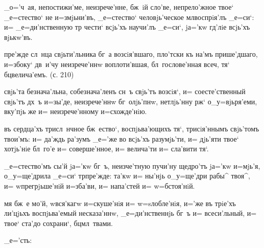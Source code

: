    _о='ч~ая, непостижи'ме, 
неизрече'нне, бж~iй сло'ве, непрело'жное твое` 
_е=стество` не и=змjьни'въ, _е=стество` человjь'ческое 
мл воспрiя'лъ _е=си`: и= _е=ди'нственную тр 
чести` всjь'хъ научи'лъ _е=си`, jа='кw гд'лiе 
всjь'хъ вjькw'въ.


  пре'жде сл~нца свjьти'льника бг~а 
возсiя'вшаго, пло'тски къ на'мъ прише'дшаго, и=з\ъ боку` 
дв~и'чу неизрече'ннw воплоти'вшая, бл~гослове'нная 
всеч, тя` бц велича'емъ. (с. 210)

 свjь'та безнача'льна, собезнача'ленъ сн~ъ 
свjь'тъ возсiя`, и= соесте'ственный свjь'тъ дх~ъ и=зы'де, 
неизрече'ннw бг~олjь'пнw, нетлjь'нну рж` 
о_у=вjьря'еми, вку'пjь же и= неизрече'нному и=схожде'нiю.

 въ сердца'хъ трисл~нчное бж~ество`, 
воспjьва'ющихъ тя`, трисiя'ннымъ свjь'томъ твои'мъ: и= 
да'ждь ра'зумъ _е='же во всjь'хъ разумjь'ти, и= дjь'яти 
твое` хотjь'нiе бл~го'е и= соверше'нное, и= велича'ти и= 
сла'вити тя`.

  _е=стество'мъ сы'й jа='кw 
бг~ъ, неизче'тную пучи'ну щедро'тъ jа='кw и=мjь'я, 
о_у=ще'дрила _е=си` тр пре'жде: та'кw и= ны'нjь 
о_у=ще'дри рабы^ твоя^, и= w\т прегрjьше'нiй и=зба'ви, и= 
напа'стей и= w=бстоя'нiй.

  мя бж~е мо'й, w\т вся'кагw 
и=скуше'нiя и= w=sлобле'нiя, и='же въ трiе'хъ ли'цjьхъ 
воспjьва'емый несказа'ннw, _е=ди'нственнjь бг~ъ и= 
всеси'льный, и= твое` ста'до сохрани`, бц мл~твами.

     
_е='сть: 

